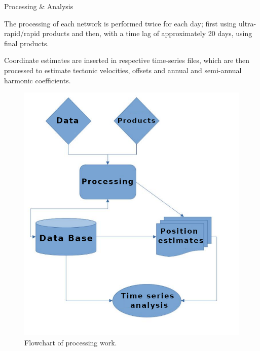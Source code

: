 \documentclass[final,a0,portrait]{beamer}
\newlength{\onecolwid}
\begin{document}
\begin{frame}[t]
\begin{columns}[t]
\begin{column}{\onecolwid}
\begin{block}{Processing \& Analysis}
{The processing of each network is performed twice for each day; first using ultra-rapid/rapid products and then, with a time 
lag of approximately 20 days, using final products. 

Coordinate estimates are inserted in respective time-series files, which are then processed to estimate tectonic velocities, 
offsets and annual and semi-annual harmonic coefficients.
}

\begin{figure}
  \centering
  \includegraphics[width=0.7\onecolwid]{proc_flowchart.png}
  \caption{Flowchart of processing work.}
  \label{fig:proc}
\end{figure}
\end{block}


\end{column}
\end{columns}
\end{frame}
\end{document}
